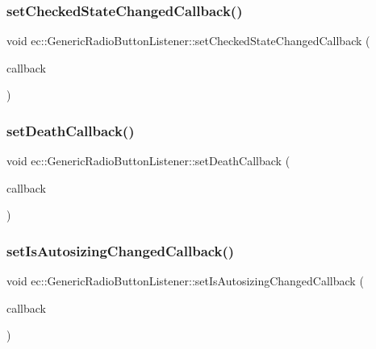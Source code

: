 \subsubsection{\texorpdfstring{set\+Checked\+State\+Changed\+Callback()}{setCheckedStateChangedCallback()}}
{\footnotesize\ttfamily void ec\+::\+Generic\+Radio\+Button\+Listener\+::set\+Checked\+State\+Changed\+Callback (\begin{DoxyParamCaption}\item[{const \mbox{\hyperlink{classec_1_1_generic_radio_button_listener_aa2ce6fc7dec8cfb263608c59f6eb338f}{Checked\+State\+Changed\+\_\+\+Callback}} \&}]{callback }\end{DoxyParamCaption})}

\mbox{\label{classec_1_1_generic_radio_button_listener_a3af49983e6fb684a7e5a6c8fa8bd14ad}} 
\subsubsection{\texorpdfstring{set\+Death\+Callback()}{setDeathCallback()}}
{\footnotesize\ttfamily void ec\+::\+Generic\+Radio\+Button\+Listener\+::set\+Death\+Callback (\begin{DoxyParamCaption}\item[{const \mbox{\hyperlink{classec_1_1_generic_radio_button_listener_aa760bb857feacd099dadc0a1b182c40f}{Death\+\_\+\+Callback}} \&}]{callback }\end{DoxyParamCaption})}

\mbox{\label{classec_1_1_generic_radio_button_listener_a3ea25db33823e0f051be69ab1552bfed}} 
\subsubsection{\texorpdfstring{set\+Is\+Autosizing\+Changed\+Callback()}{setIsAutosizingChangedCallback()}}
{\footnotesize\ttfamily void ec\+::\+Generic\+Radio\+Button\+Listener\+::set\+Is\+Autosizing\+Changed\+Callback (\begin{DoxyParamCaption}\item[{const \mbox{\hyperlink{classec_1_1_generic_radio_button_listener_adc874051d63443a9eb1ab194a1730306}{Is\+Autosizing\+Changed\+\_\+\+Callback}} \&}]{callback }\end{DoxyParamCaption})}


